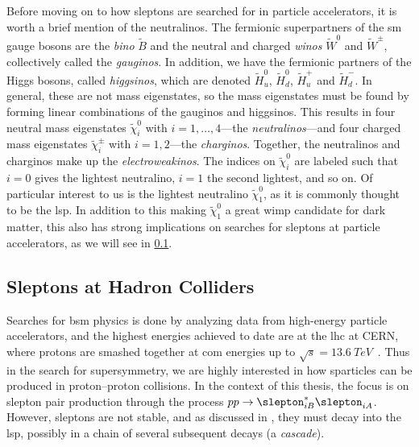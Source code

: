 Before moving on to how sleptons are searched for in particle accelerators, it is worth a brief mention of the neutralinos.
The fermionic superpartners of the \gls{sm} gauge bosons are the \emph{bino} $\tilde{B}$ and the neutral and charged \emph{winos} $\tilde{W}^0$ and $\tilde{W}^\pm$, collectively called the \emph{gauginos}.
In addition, we have the fermionic partners of the Higgs bosons, called \emph{higgsinos}, which are denoted $\tilde{H}_u^0$, $\tilde{H}_d^0$, $\tilde{H}_u^+$ and $\tilde{H}_d^-$.
In general, these are not mass eigenstates, so the mass eigenstates must be found by forming linear combinations of the gauginos and higgsinos.
This results in four neutral mass eigenstates $\tilde\chi_i^0$ with $i=1,\ldots,4$---the \emph{neutralinos}---and four charged mass eigenstates $\tilde\chi_i^\pm$ with $i=1,2$---the \emph{charginos}.
Together, the neutralinos and charginos make up the \emph{electroweakinos}.
The indices on $\tilde\chi_i^0$ are labeled such that $i=0$ gives the lightest neutralino, $i=1$ the second lightest, and so on.
Of particular interest to us is the lightest neutralino $\tilde\chi_1^0$, as it is commonly thought to be the \gls{lsp}.
In addition to this making $\tilde\chi_1^0$ a great \gls{wimp} candidate for dark matter, this also has strong implications on searches for sleptons at particle accelerators, as we will see in \cref{sec:hadron_colliders}.


\subsection{Sleptons at Hadron Colliders}\label{sec:hadron_colliders}

Searches for \gls{bsm} physics is done by analyzing data from high-energy particle accelerators, and the highest energies achieved to date are at the \gls{lhc} at CERN, where protons are smashed together at \gls{com} energies up to $\sqrt{s}=\qty{13.6}{TeV}$~\cite{ParticleDataGroup:2026aaa}.
Thus in the search for supersymmetry, we are highly interested in how sparticles can be produced in proton--proton collisions.
In the context of this thesis, the focus is on slepton pair production through the process $pp \to \slepton_{iB}^*\slepton_{iA}$.
However, sleptons are not stable, and as discussed in , they must decay into the \gls{lsp}, possibly in a chain of several subsequent decays (a \emph{cascade}).

